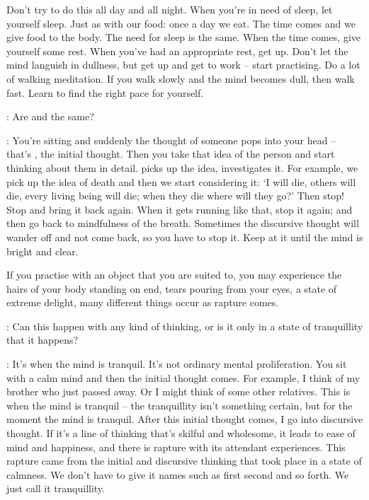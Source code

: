 Don't try to do this all day and all night. When you're in need of sleep, let yourself sleep. Just as with our food: once a day we eat. The time comes and we give food to the body. The need for sleep is the same. When the time comes, give yourself some rest. When you've had an appropriate rest, get up. Don't let the mind languish in dullness, but get up and get to work -- start practising. Do a lot of walking meditation. If you walk slowly and the mind becomes dull, then walk fast. Learn to find the right pace for yourself.

: Are  and  the same?

: You're sitting and suddenly the thought of someone pops into your head -- that's , the initial thought. Then you take that idea of the person and start thinking about them in detail.  picks up the idea,  investigates it. For example, we pick up the idea of death and then we start considering it: `I will die, others will die, every living being will die; when they die where will they go?' Then stop! Stop and bring it back again. When it gets running like that, stop it again; and then go back to mindfulness of the breath. Sometimes the discursive thought will wander off and not come back, so you have to stop it. Keep at it until the mind is bright and clear.

If you practise  with an object that you are suited to, you may experience the hairs of your body standing on end, tears pouring from your eyes, a state of extreme delight, many different things occur as rapture comes.

: Can this happen with any kind of thinking, or is it only in a state of tranquillity that it happens?

: It's when the mind is tranquil. It's not ordinary mental proliferation. You sit with a calm mind and then the initial thought comes. For example, I think of my brother who just passed away. Or I might think of some other relatives. This is when the mind is tranquil -- the tranquillity isn't something certain, but for the moment the mind is tranquil. After this initial thought comes, I go into discursive thought. If it's a line of thinking that's skilful and wholesome, it leads to ease of mind and happiness, and there is rapture with its attendant experiences. This rapture came from the initial and discursive thinking that took place in a state of calmness. We don't have to give it names such as first  second  and so forth. We just call it tranquillity.

